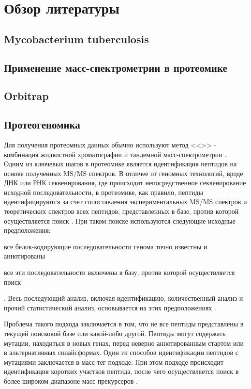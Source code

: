 \section{Обзор литературы}

\subsection{Mycobacterium tuberculosis}

\subsection{Применение масс-спектрометрии в протеомике}

\subsection{Orbitrap}

\subsection{Протеогеномика}
Для получения протеомных данных обычно используют метод <<>> - комбинация жидкостной хроматографии и тандемной масс-спектрометрии \cite{bantscheff2012quantitative}. Одним из ключевых шагов в протеомике является идентификация пептидов на основе полученных MS/MS спектров. В отличее от геномных технологий, вроде ДНК или РНК секвенирования, где происходит непосредственное секвенирование исходной последовательности, в протеомике, как правило, пептиды идентифицируются за счет сопоставления экспериментальных MS/MS спектров и теоретических спектров всех пептидов, представленных в базе, против которой осуществляется поиск \cite{nesvizhskii2010survey}.
При таком поиске используются следующие исходные предположения: 
\begin{inparaenum}
    \item все белок-кодирующие последовательности генома точно известны и аннотированы
    \item все эти последовательности включены в базу, против которой осуществляется поиск
\end{inparaenum}.
Весь последующий анализ, включая идентификацию, количественный анализ и прочий статистический анализ, основывается на этих предположениях \cite{nesvizhskii2005interpretation}.

Проблема такого подхода заключается в том, что не все пептиды представлены в текущей поисковой базе или какой-либо другой. Пептиды могут содержать мутации, находиться в новых генах, перед неверно аннотированным стартом или в альтернативных сплайсформах. 
Один из способов идентификации пептидов с мутациями заключается в масс-тег подходе. При этом подходе происходит идентификация коротких участков пептида, после чего осуществляется поиск в более широком диапазоне масс прекурсеров \cite{dasari2010tagrecon}. 

